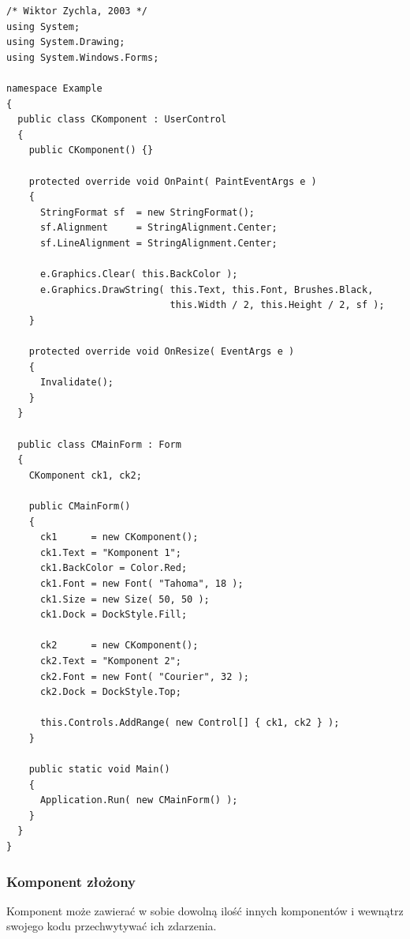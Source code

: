 \begin{scriptsize}
\begin{verbatim}
/* Wiktor Zychla, 2003 */
using System;
using System.Drawing;
using System.Windows.Forms;

namespace Example
{
  public class CKomponent : UserControl
  {
    public CKomponent() {}

    protected override void OnPaint( PaintEventArgs e )
    {
      StringFormat sf  = new StringFormat();
      sf.Alignment     = StringAlignment.Center;
      sf.LineAlignment = StringAlignment.Center;

      e.Graphics.Clear( this.BackColor );
      e.Graphics.DrawString( this.Text, this.Font, Brushes.Black, 
                             this.Width / 2, this.Height / 2, sf );
    }

    protected override void OnResize( EventArgs e )
    {
      Invalidate();
    }
  }

  public class CMainForm : Form
  {  
    CKomponent ck1, ck2;

    public CMainForm() 
    {
      ck1      = new CKomponent();
      ck1.Text = "Komponent 1";
      ck1.BackColor = Color.Red;
      ck1.Font = new Font( "Tahoma", 18 );
      ck1.Size = new Size( 50, 50 );
      ck1.Dock = DockStyle.Fill;

      ck2      = new CKomponent();
      ck2.Text = "Komponent 2";
      ck2.Font = new Font( "Courier", 32 );
      ck2.Dock = DockStyle.Top;

      this.Controls.AddRange( new Control[] { ck1, ck2 } );
    }

    public static void Main()
    {    
      Application.Run( new CMainForm() );
    }
  }
}
\end{verbatim}
\end{scriptsize}

\subsubsection{Komponent złożony}

Komponent może zawierać w sobie dowolną ilość innych komponentów i wewnątrz swojego kodu
przechwytywać ich zdarzenia.

